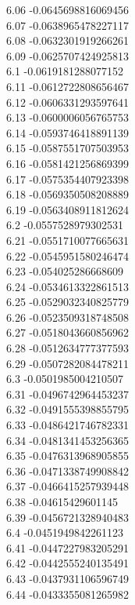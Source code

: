 {6.06	-0.0645698816069456\\
6.07	-0.0638965478227117\\
6.08	-0.0632301919266261\\
6.09	-0.0625707424925813\\
6.1	-0.0619181288077152\\
6.11	-0.0612722808656467\\
6.12	-0.0606331293597641\\
6.13	-0.0600006056765753\\
6.14	-0.0593746418891139\\
6.15	-0.0587551707503953\\
6.16	-0.0581421256869399\\
6.17	-0.0575354407923398\\
6.18	-0.0569350508208889\\
6.19	-0.0563408911812624\\
6.2	-0.0557528979302531\\
6.21	-0.0551710077665631\\
6.22	-0.0545951580246474\\
6.23	-0.054025286668609\\
6.24	-0.0534613322861513\\
6.25	-0.0529032340825779\\
6.26	-0.0523509318748508\\
6.27	-0.0518043660856962\\
6.28	-0.0512634777377593\\
6.29	-0.0507282084478211\\
6.3	-0.0501985004210507\\
6.31	-0.0496742964453237\\
6.32	-0.0491555398855795\\
6.33	-0.0486421746782331\\
6.34	-0.0481341453256365\\
6.35	-0.0476313968905855\\
6.36	-0.0471338749908842\\
6.37	-0.0466415257939448\\
6.38	-0.04615429601145\\
6.39	-0.0456721328940483\\
6.4	-0.0451949842261123\\
6.41	-0.0447227983205291\\
6.42	-0.0442555240135491\\
6.43	-0.0437931106596749\\
6.44	-0.0433355081265982\\
}
